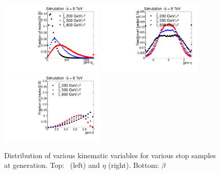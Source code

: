\begin{figure}
 \begin{center}
  \includegraphics[clip=false, trim=0.0cm 0cm 1.4cm 0cm, width=0.44\textwidth]{figures/muonly/Selection_Comp_Stop_genpT}
  \includegraphics[clip=false, trim=0.0cm 0cm 1.4cm 0cm, width=0.44\textwidth]{figures/muonly/Selection_Comp_Stop_geneta}
  \includegraphics[clip=false, trim=0.0cm 0cm 1.4cm 0cm, width=0.44\textwidth]{figures/muonly/Selection_Comp_Stop_genbeta}
 \end{center}
 \caption[Distribution of \pt, $\eta$, and $\beta$ for various stop samples at generation]
{Distribution of various kinematic variables for various stop samples at generation.
Top: \pt\ (left) and $\eta$ (right).
Bottom: $\beta$
   \label{fig:GenStop}}
\end{figure}


